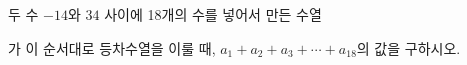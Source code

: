 두 수 $-14$와 $34$ 사이에 18개의 수를 넣어서 만든 수열\par\smallskip{}\par\smallskip\noindent 가 이 순서대로 등차수열을 이룰 때, $a_1+a_2+a_3+\cdots+a_{18}$의 값을 구하시오.
